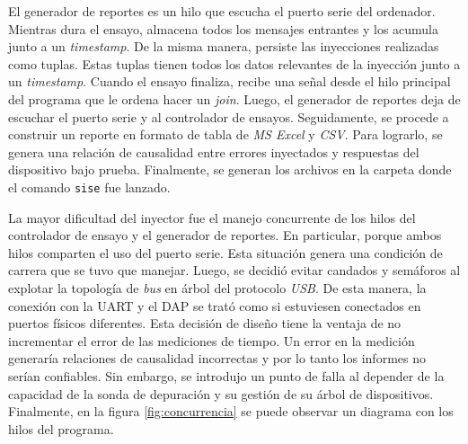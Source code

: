 El generador de reportes es un hilo que escucha el puerto serie del ordenador.
Mientras dura el ensayo, almacena todos los mensajes entrantes y los acumula junto a un \emph{timestamp}.
De la misma manera, persiste las inyecciones realizadas como tuplas.
Estas tuplas tienen todos los datos relevantes de la inyección junto a un \emph{timestamp}.
Cuando el ensayo finaliza, recibe una señal desde el hilo principal del programa que le ordena hacer un \emph{join}.
Luego, el generador de reportes deja de escuchar el puerto serie y al controlador de ensayos.
Seguidamente, se procede a construir un reporte en formato de tabla de \emph{MS Excel} y \emph{CSV}.
Para lograrlo, se genera una relación de causalidad entre errores inyectados y respuestas del dispositivo bajo prueba.
Finalmente, se generan los archivos en la carpeta donde el comando \texttt{sise} fue lanzado.


La mayor dificultad del inyector fue el manejo concurrente de los hilos del controlador de ensayo y el generador de reportes.
En particular, porque ambos hilos comparten el uso del puerto serie.
Esta situación genera una condición de carrera que se tuvo que manejar.
Luego, se decidió evitar candados y semáforos al explotar la topología de \emph{bus} en árbol del protocolo \emph{USB}.
De esta manera, la conexión con la UART y el DAP se trató como si estuviesen conectados en puertos físicos diferentes.
Esta decisión de diseño tiene la ventaja de no incrementar el error de las mediciones de tiempo.
Un error en la medición generaría relaciones de causalidad incorrectas y por lo tanto los informes no serían confiables.
Sin embargo, se introdujo un punto de falla al depender de la capacidad de la sonda de depuración y su gestión de su árbol de dispositivos.
Finalmente, en la figura \ref{fig:concurrencia} se puede observar un diagrama con los hilos del programa.

